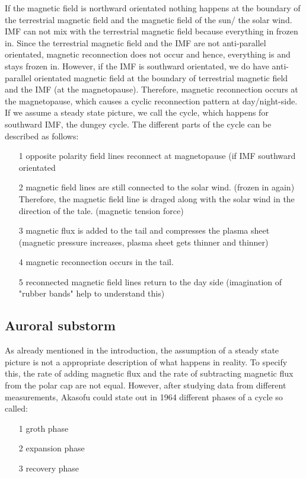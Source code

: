 \documentclass[10pt,a4paper]{article}
\begin{document}
If the magnetic field is northward orientated nothing happens at the boundary of the terrestrial magnetic field and the magnetic field of the sun/ the solar wind. IMF can not mix with the terrestrial magnetic field because everything in frozen in. Since the terrestrial magnetic field and the IMF are not anti-parallel orientated, magnetic reconnection does not occur and hence, everything is and stays frozen in. 
However, if the IMF is southward orientated, we do have anti-parallel orientated magnetic field at the boundary of terrestrial magnetic field and the IMF (at the magnetopause). Therefore, magnetic reconnection occurs at the magnetopause, which causes a cyclic reconnection pattern at day/night-side. If we assume a steady state picture, we call the cycle, which happens for southward IMF, the dungey cycle. The different parts of the cycle can be described as follows:
\begin{itemize}
\item[1] opposite polarity field lines reconnect at magnetopause (if IMF southward orientated
\item[2] magnetic field lines are still connected to the solar wind. (frozen in again) Therefore, the magnetic field line is draged along with the solar wind in the direction of the tale. (magnetic tension force)
\item[3] magnetic flux is added to the tail and compresses the plasma sheet (magnetic pressure increases, plasma sheet gets thinner and thinner)
\item[4] magnetic reconnection occurs in the tail. 
\item[5] reconnected magnetic field lines return to the day side (imagination of "rubber bands" help to understand this)
\end{itemize}
\subsection{Auroral substorm}
As already mentioned in the introduction, the assumption of a steady state picture is not a appropriate description of what happens in reality. To specify this, the rate of adding magnetic flux and the rate of subtracting magnetic flux from the polar cap are not equal. However, after studying data from different measurements, Akasofu could state out in 1964 different phases of a cycle so called:
\begin{itemize}
\item[1] groth phase
\item[2] expansion phase
\item[3] recovery phase
\end{itemize}
\end{document}
